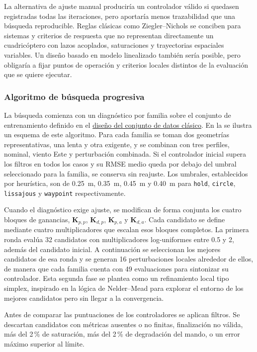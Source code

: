 La alternativa de ajuste manual produciría un controlador válido si quedasen
registradas todas las iteraciones, pero aportaría menos trazabilidad que una
búsqueda reproducible. Reglas clásicas como Ziegler--Nichols se conciben para
sistemas y criterios de respuesta que no representan directamente un
cuadricóptero con lazos acoplados, saturaciones y trayectorias espaciales
variables. Un diseño basado en modelo linealizado también sería posible, pero
obligaría a fijar puntos de operación y criterios locales distintos de la
evaluación que se quiere ejecutar.

\subsubsection*{Algoritmo de búsqueda progresiva}
\label{subsubsec:busqueda-progresiva}
La búsqueda comienza con un diagnóstico por familia sobre el conjunto de
entrenamiento definido en el
\hyperref[subsubsec:diseno-dataset-clasico]{diseño del conjunto de datos
clásico}. En la  se ilustra un esquema de este algoritmo. Para cada
familia se toman dos geometrías representativas, una lenta y otra exigente, y se
combinan con tres perfiles, nominal, viento Este y perturbación combinada. Si el
controlador inicial supera los filtros en todos los casos y su RMSE medio
queda por debajo del umbral seleccionado para la familia, se conserva sin reajuste. Los umbrales,
establecidos por heurística, son de \SI{0.25}{m}, \SI{0.35}{m}, \SI{0.45}{m} y \SI{0.40}{m} para
 \texttt{hold}, \texttt{circle}, \texttt{lissajous} y \texttt{waypoint} respectivamente.

Cuando el diagnóstico exige ajuste, se modifican de forma conjunta los cuatro
bloques de ganancias,
$\bm{K}_{p,p}$, $\bm{K}_{d,p}$, $\bm{K}_{p,a}$ y $\bm{K}_{d,a}$. Cada candidato
se define mediante cuatro multiplicadores que escalan esos bloques completos.
La primera ronda evalúa 32 candidatos con multiplicadores log-uniformes entre
0.5 y 2, además del candidato inicial. A continuación se seleccionan los mejores
candidatos de esa ronda y se generan 16 perturbaciones locales alrededor
de ellos, de manera que cada familia cuenta con 49 evaluaciones para sintonizar
su controlador. Esta segunda fase se plantea como un refinamiento local tipo simplex, inspirado en
la lógica de Nelder--Mead \cite{nelder1965simplex} para explorar el entorno de los
mejores candidatos pero sin llegar a la convergencia.

Antes de comparar las puntuaciones de los controladores se aplican filtros. Se descartan
candidatos con métricas ausentes o no finitas, finalización no válida, más del 2\,\% de
saturación, más del 2\,\% de degradación del mando, o un error máximo superior al límite.

